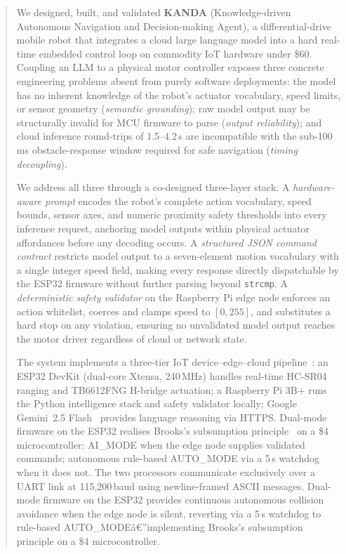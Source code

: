 \documentclass[conference]{IEEEtran}
\begin{document}
\begin{abstract}
We designed, built, and validated \textbf{KANDA} (Knowledge-driven Autonomous
Navigation and Decision-making Agent), a differential-drive mobile robot that
integrates a cloud large language model into a hard real-time embedded control
loop on commodity IoT hardware under \$60.
Coupling an LLM to a physical motor controller exposes three concrete
engineering problems absent from purely software deployments: the model has no
inherent knowledge of the robot's actuator vocabulary, speed limits, or sensor
geometry (\emph{semantic grounding}); raw model output may be structurally
invalid for MCU firmware to parse (\emph{output reliability}); and cloud
inference round-trips of 1.5--4.2\,s are incompatible with the sub-100\,ms
obstacle-response window required for safe navigation
(\emph{timing decoupling}).

We address all three through a co-designed three-layer stack.
A \emph{hardware-aware prompt} encodes the robot's complete action vocabulary,
speed bounds, sensor axes, and numeric proximity safety thresholds into every
inference request, anchoring model outputs within physical actuator affordances
before any decoding occurs.
A \emph{structured JSON command contract} restricts model output to a
seven-element motion vocabulary with a single integer speed field, making every
response directly dispatchable by the ESP32 firmware without further parsing
beyond \texttt{strcmp}.
A \emph{deterministic safety validator} on the Raspberry Pi edge node enforces
an action whitelist, coerces and clamps speed to $[0,255]$, and substitutes a
hard stop on any violation, ensuring no unvalidated model output reaches the
motor driver regardless of cloud or network state.

The system implements a three-tier IoT device--edge--cloud
pipeline~\cite{bonomi2012fog,shi2016edge}: an ESP32 DevKit (dual-core Xtensa,
240\,MHz) handles real-time HC-SR04 ranging and TB6612FNG H-bridge actuation;
a Raspberry Pi 3B+ runs the Python intelligence stack and safety validator
locally; Google Gemini~2.5 Flash~\cite{gemini2023report} provides language
reasoning via HTTPS.
Dual-mode firmware on the ESP32 realises Brooks's subsumption
principle~\cite{brooks1986robust} on a \$4 microcontroller: AI\_MODE when
the edge node supplies validated commands; autonomous rule-based AUTO\_MODE
via a 5\,s watchdog when it does not.
The two processors communicate exclusively over a UART link at
115,200\,baud using newline-framed ASCII messages.
Dual-mode firmware on the ESP32 provides continuous autonomous collision
avoidance when the edge node is silent, reverting via a 5\,s watchdog
to rule-based AUTO\_MODEâ€”implementing Brooks's subsumption principle on a
\$4 microcontroller.


\end{abstract}
\end{document}
